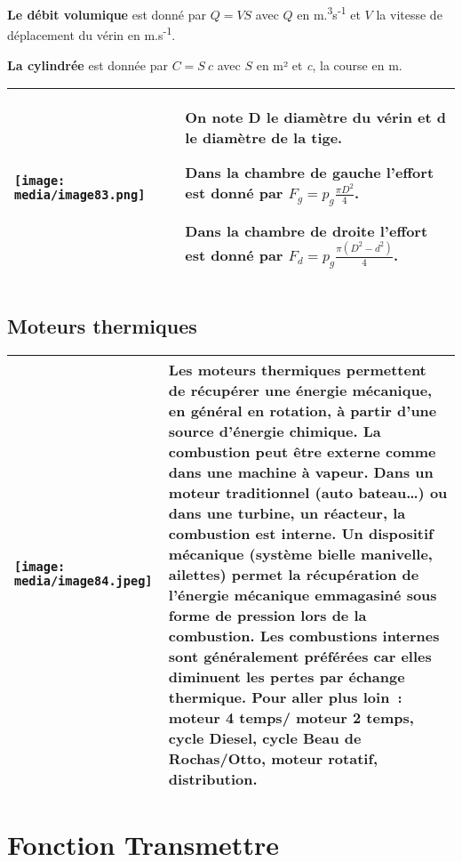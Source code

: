 \documentclass[
]{article}
\begin{document}
\textbf{Le débit volumique} est donné par \(Q = VS\) avec \(Q\) en
m.\textsuperscript{3}s\textsuperscript{-1} et \(V\) la vitesse de
déplacement du vérin en m.s\textsuperscript{-1}.

\textbf{La cylindrée} est donnée par \(C = S\ c\) avec \(S\) en m² et
\emph{c}, la course en m.

\begin{longtable}[]{@{}
  >{\raggedright\arraybackslash}p{}
  >{\raggedright\arraybackslash}p{}@{}}
\toprule
\endhead
\texttt{[image: media/image83.png]} &
On note D le diamètre du vérin et d le diamètre de la tige.

Dans la chambre de gauche l'effort est donné par
\(F_{g} = p_{g}\frac{\pi D^{2}}{4}\).

Dans la chambre de droite l'effort est donné par
\(F_{d} = p_{g}\frac{\pi\left( D^{2} - d^{2} \right)}{4}\). \\
\bottomrule
\end{longtable}

\hypertarget{moteurs-thermiques}{%
\subsection{Moteurs thermiques}\label{moteurs-thermiques}}

\begin{longtable}[]{@{}ll@{}}
\toprule
\endhead
\texttt{[image: media/image84.jpeg]} &
Les moteurs thermiques permettent de récupérer une énergie mécanique, en
général en rotation, à partir d'une source d'énergie chimique. La
combustion peut être externe comme dans une machine à vapeur. Dans un
moteur traditionnel (auto bateau\ldots) ou dans une turbine, un
réacteur, la combustion est interne. Un dispositif mécanique (système
bielle manivelle, ailettes) permet la récupération de l'énergie
mécanique emmagasiné sous forme de pression lors de la combustion. Les
combustions internes sont généralement préférées car elles diminuent les
pertes par échange thermique. Pour aller plus loin~: moteur 4 temps/
moteur 2 temps, cycle Diesel, cycle Beau de Rochas/Otto, moteur rotatif,
distribution. \\
\bottomrule
\end{longtable}

\hypertarget{fonction-transmettre}{%
\section{Fonction Transmettre}\label{fonction-transmettre}}
\end{document}
